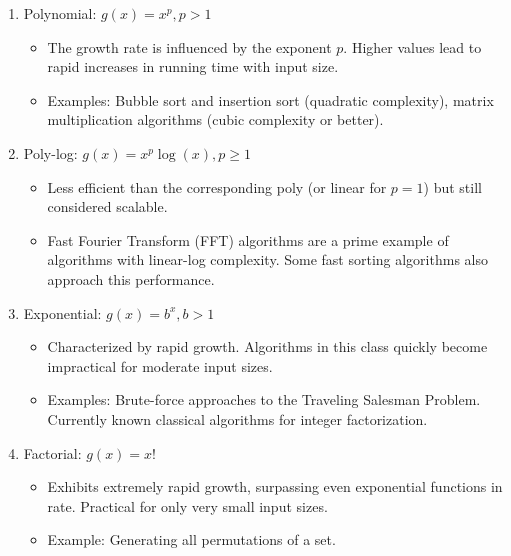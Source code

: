 \documentclass[12pt]{article}
\begin{document}
\begin{enumerate}
\begin{itemize}
        \item Common examples are searching in unsorted lists and identifying max/min elements in a list.
    \end{itemize}
    
    \item Polynomial: $g(x) = x^p, p > 1$
    \begin{itemize}
        \item The growth rate is influenced by the exponent $p$. Higher values lead to rapid increases in running time with input size.
        
        \item Examples: Bubble sort and insertion sort (quadratic complexity), matrix multiplication algorithms (cubic complexity or better).
    \end{itemize}
    
    \item Poly-log: $g(x) = x^p \log(x), p \geq 1$
    \begin{itemize}
        \item Less efficient than the corresponding poly (or linear for $p = 1$) but still considered scalable.
        
        \item Fast Fourier Transform (FFT) algorithms are a prime example of algorithms with linear-log complexity. Some fast sorting algorithms also approach this performance.
    \end{itemize}
    
    \item Exponential: $g(x) = b^x, b > 1$
    \begin{itemize}
        \item Characterized by rapid growth. Algorithms in this class quickly become impractical for moderate input sizes.
        
        \item Examples: Brute-force approaches to the Traveling Salesman Problem. Currently known classical algorithms for integer factorization.
    \end{itemize}
    
    \item Factorial: $g(x) = x!$
    \begin{itemize}
        \item Exhibits extremely rapid growth, surpassing even exponential functions in rate. Practical for only very small input sizes.
        
        \item Example: Generating all permutations of a set.
    \end{itemize}
    

\end{enumerate}
\end{document}
